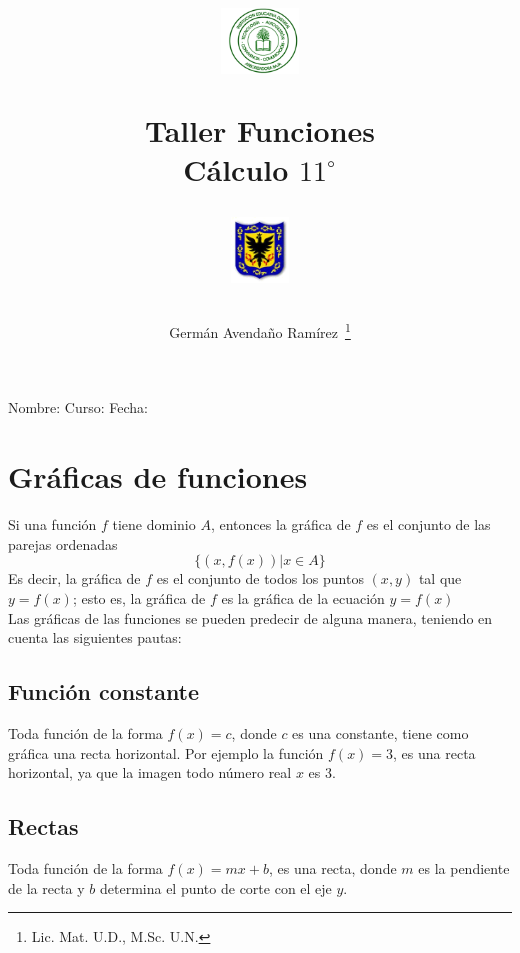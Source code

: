 \documentclass[10pt,twoside]{article}
\author{Germ\'an Avenda\~no Ram\'irez~\thanks{Lic. Mat. U.D., M.Sc. U.N.}}
\title{\begin{minipage}{.2\textwidth}
\includegraphics[height=1.75cm]{Images/logo-colegio.png}\end{minipage}
\begin{minipage}{.55\textwidth}
\begin{center}
Taller Funciones \\
Cálculo $11^{\circ}$
\end{center}
\end{minipage}\hfill
\begin{minipage}{.2\textwidth}
\includegraphics[height=1.75cm]{Images/logo-sed.png} 
\end{minipage}}
\date{}
\begin{document}
\maketitle
Nombre: \hrulefill Curso: \underline{\hspace*{44pt}} Fecha: \underline{\hspace*{2.5cm}}
\section{Gráficas de funciones}
Si una función $ f $ tiene dominio $ A $, entonces la gráfica de $ f $ es el conjunto de las parejas ordenadas
\[ \{(x,f(x)) | x \in A\} \]
Es decir, la gráfica de $ f $ es el conjunto de todos los puntos $ (x,y) $ tal que $ y=f(x) $; esto es, la gráfica de $ f $ es la gráfica de la ecuación $ y=f(x) $\\

Las gráficas de las funciones se pueden predecir de alguna manera, teniendo en cuenta las siguientes pautas:
\subsection{Función constante}
Toda función de la forma $ f(x)=c $, donde $ c $ es una constante, tiene como gráfica una recta horizontal. Por ejemplo la función $ f(x)=3 $, es una recta horizontal, ya que la imagen todo número real $ x $ es 3.
\subsection{Rectas}
Toda función de la forma $ f(x)=mx+b $, es una recta, donde $ m $ es la pendiente de la recta y $ b $ determina el punto de corte con el eje $ y $.
\end{document}
